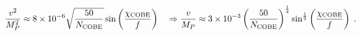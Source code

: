 \begin{equation}
\frac{v^2}{M_P^2} \approx 8\times 10^{-6} \sqrt{\frac{50}{N_{\rm COBE}}}
\sin \left( \frac{\chi_{\rm COBE}}{f}\right) \quad
\Rightarrow \frac{v}{M_P} \approx 3\times 10^{-3}
\left(\frac{50}{N_{\rm COBE}}\right)^{\frac{1}{4}}
\sin^{\frac{1}{2}} \left( \frac{\chi_{\rm COBE}}{f}\right) \;.
\end{equation}

